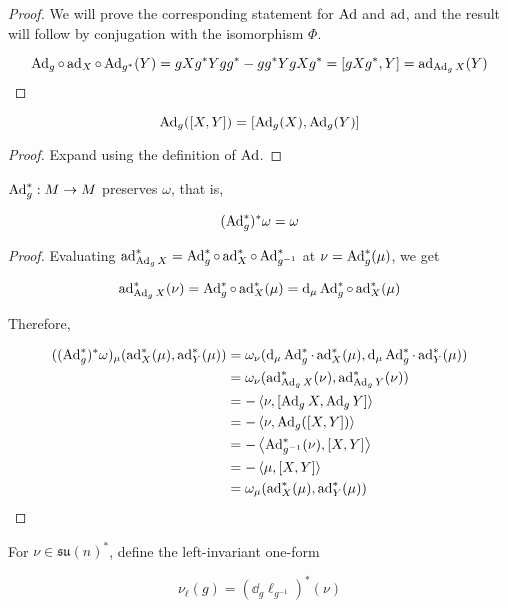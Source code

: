 \documentclass{article}
\newcommand{\su}{\mathfrak{su}}
\begin{document}
\begin{proof}
    We will prove the corresponding statement for \(\operatorname{Ad}\) and \(\operatorname{ad}\), and the result will follow by conjugation with the isomorphism \(\Phi\).

    \[\operatorname{Ad}_g \circ \operatorname{ad}_X \circ \operatorname{Ad}_{g^*}(Y)= gX g^* Y g g^* - g g^* Y g X g^* = [gX g^*, Y] = \operatorname{ad}_{\operatorname{Ad}_gX}(Y)\]
\end{proof}

\begin{lemma}
    \[\operatorname{Ad}_g([X, Y]) = [\operatorname{Ad}_g(X), \operatorname{Ad}_g(Y)]\]
\end{lemma}

\begin{proof}
    Expand using the definition of \(\operatorname{Ad}\).
\end{proof}

\begin{lemma}
    \(\operatorname{Ad}_g^* :  M \to  M\) preserves \(\omega\), that is,

    \[(\operatorname{Ad}_g^*)^*\omega = \omega\]
\end{lemma}

\begin{proof}
    Evaluating \(\operatorname{ad}^*_{\operatorname{Ad}_gX} = \operatorname{Ad}_g^* \circ \operatorname{ad}_X^* \circ \operatorname{Ad}_{g^{-1}}^*\) at \(\nu = \operatorname{Ad}_g^*(\mu)\), we get

    \[\operatorname{ad}^*_{\operatorname{Ad}_gX}(\nu) = \operatorname{Ad}_g^* \circ \operatorname{ad}_X^*(\mu) = \dd_\mu\operatorname{Ad}_g^* \circ \operatorname{ad}_X^*(\mu)\]

    Therefore,

    \begin{align*}
        ((\operatorname{Ad}_g^*)^*\omega)_\mu(\operatorname{ad}_X^*(\mu), \operatorname{ad}_Y^*(\mu)) &= \omega_\nu(\dd_\mu \operatorname{Ad}_g^* \cdot \operatorname{ad}_X^*(\mu), \dd_\mu \operatorname{Ad}_g^* \cdot \operatorname{ad}_Y^*(\mu)) \\
        &= \omega_\nu(\operatorname{ad}^*_{\operatorname{Ad}_gX}(\nu), \operatorname{ad}^*_{\operatorname{Ad}_gY}(\nu)) \\
        &= -\left\langle \nu, [\operatorname{Ad}_gX, \operatorname{Ad}_gY] \right\rangle \\
        &= -\left\langle \nu, \operatorname{Ad}_g([X, Y]) \right\rangle \\
        &= -\left\langle \operatorname{Ad}_{g^{-1}}^*(\nu), [X, Y] \right\rangle \\
        &= -\left\langle \mu, [X, Y] \right\rangle \\
        &= \omega_\mu(\operatorname{ad}_X^*(\mu), \operatorname{ad}_Y^*(\mu))
    \end{align*}
\end{proof}

For \(\nu \in \su(n)^*\), define the left-invariant one-form

\[\nu_\ell(g) = (\dd_g\ell_{g^{-1}})^*(\nu)\]
\end{document}
